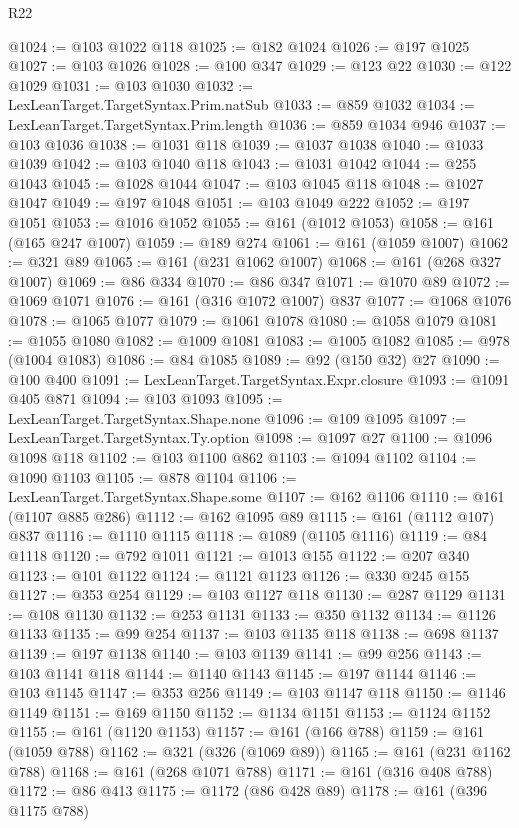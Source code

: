 \begin{lexlean}{R22}
\begin{coremodule}
@1024 := @103 @1022 @118
@1025 := @182 @1024
@1026 := @197 @1025
@1027 := @103 @1026
@1028 := @100 @347
@1029 := @123 @22
@1030 := @122 @1029
@1031 := @103 @1030
@1032 := LexLeanTarget.TargetSyntax.Prim.natSub
@1033 := @859 @1032
@1034 := LexLeanTarget.TargetSyntax.Prim.length
@1036 := @859 @1034 @946
@1037 := @103 @1036
@1038 := @1031 @118
@1039 := @1037 @1038
@1040 := @1033 @1039
@1042 := @103 @1040 @118
@1043 := @1031 @1042
@1044 := @255 @1043
@1045 := @1028 @1044
@1047 := @103 @1045 @118
@1048 := @1027 @1047
@1049 := @197 @1048
@1051 := @103 @1049 @222
@1052 := @197 @1051
@1053 := @1016 @1052
@1055 := @161 (@1012 @1053)
@1058 := @161 (@165 @247 @1007)
@1059 := @189 @274
@1061 := @161 (@1059 @1007)
@1062 := @321 @89
@1065 := @161 (@231 @1062 @1007)
@1068 := @161 (@268 @327 @1007)
@1069 := @86 @334
@1070 := @86 @347
@1071 := @1070 @89
@1072 := @1069 @1071
@1076 := @161 (@316 @1072 @1007) @837
@1077 := @1068 @1076
@1078 := @1065 @1077
@1079 := @1061 @1078
@1080 := @1058 @1079
@1081 := @1055 @1080
@1082 := @1009 @1081
@1083 := @1005 @1082
@1085 := @978 (@1004 @1083)
@1086 := @84 @1085
@1089 := @92 (@150 @32) @27
@1090 := @100 @400
@1091 := LexLeanTarget.TargetSyntax.Expr.closure
@1093 := @1091 @405 @871
@1094 := @103 @1093
@1095 := LexLeanTarget.TargetSyntax.Shape.none
@1096 := @109 @1095
@1097 := LexLeanTarget.TargetSyntax.Ty.option
@1098 := @1097 @27
@1100 := @1096 @1098 @118
@1102 := @103 @1100 @862
@1103 := @1094 @1102
@1104 := @1090 @1103
@1105 := @878 @1104
@1106 := LexLeanTarget.TargetSyntax.Shape.some
@1107 := @162 @1106
@1110 := @161 (@1107 @885 @286)
@1112 := @162 @1095 @89
@1115 := @161 (@1112 @107) @837
@1116 := @1110 @1115
@1118 := @1089 (@1105 @1116)
@1119 := @84 @1118
@1120 := @792 @1011
@1121 := @1013 @155
@1122 := @207 @340
@1123 := @101 @1122
@1124 := @1121 @1123
@1126 := @330 @245 @155
@1127 := @353 @254
@1129 := @103 @1127 @118
@1130 := @287 @1129
@1131 := @108 @1130
@1132 := @253 @1131
@1133 := @350 @1132
@1134 := @1126 @1133
@1135 := @99 @254
@1137 := @103 @1135 @118
@1138 := @698 @1137
@1139 := @197 @1138
@1140 := @103 @1139
@1141 := @99 @256
@1143 := @103 @1141 @118
@1144 := @1140 @1143
@1145 := @197 @1144
@1146 := @103 @1145
@1147 := @353 @256
@1149 := @103 @1147 @118
@1150 := @1146 @1149
@1151 := @169 @1150
@1152 := @1134 @1151
@1153 := @1124 @1152
@1155 := @161 (@1120 @1153)
@1157 := @161 (@166 @788)
@1159 := @161 (@1059 @788)
@1162 := @321 (@326 (@1069 @89))
@1165 := @161 (@231 @1162 @788)
@1168 := @161 (@268 @1071 @788)
@1171 := @161 (@316 @408 @788)
@1172 := @86 @413
@1175 := @1172 (@86 @428 @89)
@1178 := @161 (@396 @1175 @788)

\end{coremodule}
\end{lexlean}

